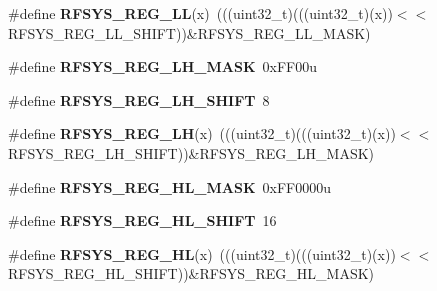 \begin{DoxyCompactItemize}
\item 
\#define {\bfseries R\+F\+S\+Y\+S\+\_\+\+R\+E\+G\+\_\+\+LL}(x)~(((uint32\+\_\+t)(((uint32\+\_\+t)(x))$<$$<$R\+F\+S\+Y\+S\+\_\+\+R\+E\+G\+\_\+\+L\+L\+\_\+\+S\+H\+I\+FT))\&R\+F\+S\+Y\+S\+\_\+\+R\+E\+G\+\_\+\+L\+L\+\_\+\+M\+A\+SK)\hypertarget{group__RFSYS__Register__Masks_gaf197b94e2d03011c483dee604724cfda}{}\label{group__RFSYS__Register__Masks_gaf197b94e2d03011c483dee604724cfda}

\item 
\#define {\bfseries R\+F\+S\+Y\+S\+\_\+\+R\+E\+G\+\_\+\+L\+H\+\_\+\+M\+A\+SK}~0x\+F\+F00u\hypertarget{group__RFSYS__Register__Masks_ga9f8ddcb45324c34fd2d19417b8b13d11}{}\label{group__RFSYS__Register__Masks_ga9f8ddcb45324c34fd2d19417b8b13d11}

\item 
\#define {\bfseries R\+F\+S\+Y\+S\+\_\+\+R\+E\+G\+\_\+\+L\+H\+\_\+\+S\+H\+I\+FT}~8\hypertarget{group__RFSYS__Register__Masks_gabe96c857aab7668805c1fb3ea46693bf}{}\label{group__RFSYS__Register__Masks_gabe96c857aab7668805c1fb3ea46693bf}

\item 
\#define {\bfseries R\+F\+S\+Y\+S\+\_\+\+R\+E\+G\+\_\+\+LH}(x)~(((uint32\+\_\+t)(((uint32\+\_\+t)(x))$<$$<$R\+F\+S\+Y\+S\+\_\+\+R\+E\+G\+\_\+\+L\+H\+\_\+\+S\+H\+I\+FT))\&R\+F\+S\+Y\+S\+\_\+\+R\+E\+G\+\_\+\+L\+H\+\_\+\+M\+A\+SK)\hypertarget{group__RFSYS__Register__Masks_ga9b8cd1814fd5957849b91bfd1bdf6ac6}{}\label{group__RFSYS__Register__Masks_ga9b8cd1814fd5957849b91bfd1bdf6ac6}

\item 
\#define {\bfseries R\+F\+S\+Y\+S\+\_\+\+R\+E\+G\+\_\+\+H\+L\+\_\+\+M\+A\+SK}~0x\+F\+F0000u\hypertarget{group__RFSYS__Register__Masks_ga063f595b6c7267627c96048590611cc1}{}\label{group__RFSYS__Register__Masks_ga063f595b6c7267627c96048590611cc1}

\item 
\#define {\bfseries R\+F\+S\+Y\+S\+\_\+\+R\+E\+G\+\_\+\+H\+L\+\_\+\+S\+H\+I\+FT}~16\hypertarget{group__RFSYS__Register__Masks_gabc34a2d1963a697d1a773a8981a063f5}{}\label{group__RFSYS__Register__Masks_gabc34a2d1963a697d1a773a8981a063f5}

\item 
\#define {\bfseries R\+F\+S\+Y\+S\+\_\+\+R\+E\+G\+\_\+\+HL}(x)~(((uint32\+\_\+t)(((uint32\+\_\+t)(x))$<$$<$R\+F\+S\+Y\+S\+\_\+\+R\+E\+G\+\_\+\+H\+L\+\_\+\+S\+H\+I\+FT))\&R\+F\+S\+Y\+S\+\_\+\+R\+E\+G\+\_\+\+H\+L\+\_\+\+M\+A\+SK)\hypertarget{group__RFSYS__Register__Masks_gaea8beedf47675b6b2c630526a03d90e5}{}\label{group__RFSYS__Register__Masks_gaea8beedf47675b6b2c630526a03d90e5}


\end{DoxyCompactItemize}
